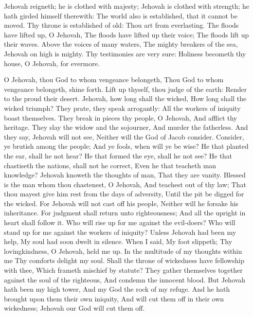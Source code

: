 Jehovah reigneth; he is clothed with majesty; Jehovah is clothed with strength; he hath girded himself therewith: The world also is established, that it cannot be moved.  Thy throne is established of old: Thou art from everlasting.  The floods have lifted up, O Jehovah, The floods have lifted up their voice; The floods lift up their waves.  Above the voices of many waters, The mighty breakers of the sea, Jehovah on high is mighty.  Thy testimonies are very sure: Holiness becometh thy house, O Jehovah, for evermore. 

O Jehovah, thou God to whom vengeance belongeth, Thou God to whom vengeance belongeth, shine forth.  Lift up thyself, thou judge of the earth: Render to the proud their desert.  Jehovah, how long shall the wicked, How long shall the wicked triumph?  They prate, they speak arrogantly: All the workers of iniquity boast themselves.  They break in pieces thy people, O Jehovah, And afflict thy heritage.  They slay the widow and the sojourner, And murder the fatherless.  And they say, Jehovah will not see, Neither will the God of Jacob consider.  Consider, ye brutish among the people; And ye fools, when will ye be wise?  He that planted the ear, shall he not hear? He that formed the eye, shall he not see?  He that chastiseth the nations, shall not he correct, Even he that teacheth man knowledge?  Jehovah knoweth the thoughts of man, That they are vanity.  Blessed is the man whom thou chastenest, O Jehovah, And teachest out of thy law;  That thou mayest give him rest from the days of adversity, Until the pit be digged for the wicked.  For Jehovah will not cast off his people, Neither will he forsake his inheritance.  For judgment shall return unto righteousness; And all the upright in heart shall follow it.  Who will rise up for me against the evil-doers? Who will stand up for me against the workers of iniquity?  Unless Jehovah had been my help, My soul had soon dwelt in silence.  When I said, My foot slippeth; Thy lovingkindness, O Jehovah, held me up.  In the multitude of my thoughts within me Thy comforts delight my soul.  Shall the throne of wickedness have fellowship with thee, Which frameth mischief by statute?  They gather themselves together against the soul of the righteous, And condemn the innocent blood.  But Jehovah hath been my high tower, And my God the rock of my refuge.  And he hath brought upon them their own iniquity, And will cut them off in their own wickedness; Jehovah our God will cut them off. 

